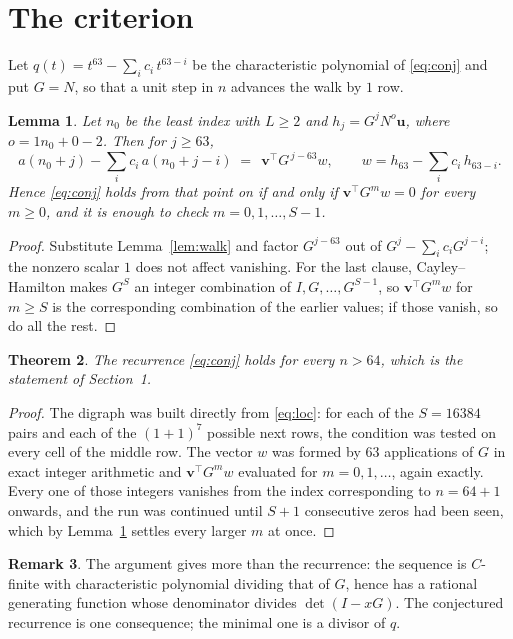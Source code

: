 \documentclass[11pt,a4paper]{article}
\theoremstyle{plain}
\newtheorem{theorem}{Theorem}
\newtheorem{lemma}[theorem]{Lemma}
\theoremstyle{definition}
\newtheorem{remark}[theorem]{Remark}
\begin{document}
\section{The criterion}

Let $q(t)=t^{63}-\sum_i c_i\,t^{63-i}$ be the characteristic polynomial of
\eqref{eq:conj} and put $G=N$, so that a unit step in $n$ advances the walk by
$1$ row.

\begin{lemma}\label{lem:crit}
Let $n_0$ be the least index with $L\ge2$ and $h_j=G^{j}N^{o}\mathbf{u}$, where
$o=1n_0+0-2$. Then for $j\ge63$,
\[
a(n_0+j)-\sum_i c_i\,a(n_0+j-i)\;=\;\,\mathbf{v}^{\!\top}G^{\,j-63}w,
\qquad w=h_{63}-\sum_i c_i\,h_{63-i} .
\]
Hence \eqref{eq:conj} holds from that point on if and only if
$\mathbf{v}^{\!\top}G^{m}w=0$ for every $m\ge0$, and it is enough to check
$m=0,1,\dots,S-1$.
\end{lemma}

\begin{proof}
Substitute Lemma~\ref{lem:walk} and factor $G^{j-63}$ out of
$G^{j}-\sum_ic_iG^{j-i}$; the nonzero scalar $1$ does not affect
vanishing. For the last clause, Cayley--Hamilton makes $G^{S}$ an integer combination of
$I,G,\dots,G^{S-1}$, so $\mathbf{v}^{\!\top}G^{m}w$ for $m\ge S$ is the corresponding
combination of the earlier values; if those vanish, so do all the rest.
\end{proof}

\begin{theorem}
The recurrence \eqref{eq:conj} holds for every $n>64$, which is the statement of
Section~1.
\end{theorem}

\begin{proof}
The digraph was built directly from \eqref{eq:loc}: for each of the $S=16384$ pairs and each
of the $(1+1)^{7}$ possible next rows, the condition was tested on every cell of
the middle row. The vector $w$ was formed by $63$ applications of $G$ in exact integer
arithmetic and $\mathbf{v}^{\!\top}G^{m}w$ evaluated for $m=0,1,\dots$, again exactly.
Every one of those integers vanishes from the index corresponding to $n=64+1$ onwards,
and the run was continued until $S+1$ consecutive zeros had been seen, which by
Lemma~\ref{lem:crit} settles every larger $m$ at once.
\end{proof}

\begin{remark}
The argument gives more than the recurrence: the sequence is $C$-finite with characteristic
polynomial dividing that of $G$, hence has a rational generating function whose denominator
divides $\det(I-xG)$. The conjectured recurrence is one consequence; the minimal one is a
divisor of $q$.
\end{remark}
\end{document}
